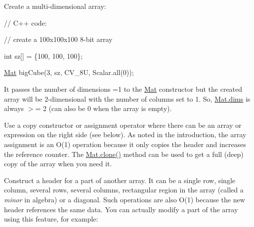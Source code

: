 \begin{DoxyItemize}
\item Create a multi-\/dimensional array\+: 
\end{DoxyItemize}

{\ttfamily }

{\ttfamily }

{\ttfamily }

{\ttfamily // C++ code\+:}

{\ttfamily }

{\ttfamily }

{\ttfamily // create a 100x100x100 8-\/bit array}

{\ttfamily }

{\ttfamily }

{\ttfamily int sz\mbox{[}\mbox{]} = \{100, 100, 100\};}

{\ttfamily }

{\ttfamily }

{\ttfamily \mbox{\hyperlink{classorg_1_1opencv_1_1core_1_1_mat}{Mat}} big\+Cube(3, sz, C\+V\+\_\+8U, Scalar.\+all(0));}

{\ttfamily }

{\ttfamily }

{\ttfamily }

It passes the number of dimensions =1 to the {\ttfamily \mbox{\hyperlink{classorg_1_1opencv_1_1core_1_1_mat}{Mat}}} constructor but the created array will be 2-\/dimensional with the number of columns set to 1. So, {\ttfamily \mbox{\hyperlink{classorg_1_1opencv_1_1core_1_1_mat_a9da03786400df5d6ef7ff4217f9a93f9}{Mat.\+dims}}} is always $>$= 2 (can also be 0 when the array is empty).


\begin{DoxyItemize}
\item Use a copy constructor or assignment operator where there can be an array or expression on the right side (see below). As noted in the introduction, the array assignment is an O(1) operation because it only copies the header and increases the reference counter. The {\ttfamily \mbox{\hyperlink{classorg_1_1opencv_1_1core_1_1_mat_a7e40ecb438d2ec75e24e209b7bee0be2}{Mat.\+clone()}}} method can be used to get a full (deep) copy of the array when you need it. 
\item Construct a header for a part of another array. It can be a single row, single column, several rows, several columns, rectangular region in the array (called a {\itshape minor} in algebra) or a diagonal. Such operations are also O(1) because the new header references the same data. You can actually modify a part of the array using this feature, for example\+: 
\end{DoxyItemize}

